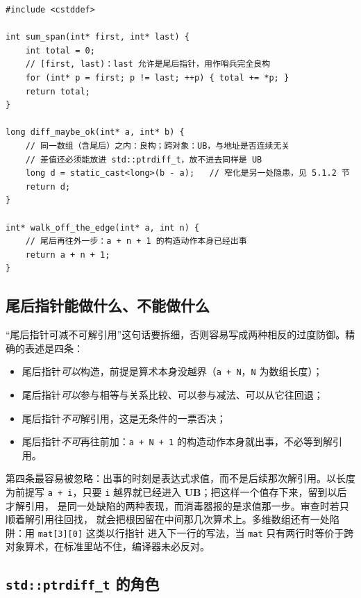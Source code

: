 \documentclass[12pt,a4paper,fontset=fandol]{ctexbook}
\newcommand{\Tp}[1]{\texttt{#1}}
\newcommand{\UB}{\textbf{\textsf{UB}}}
\begin{document}
\begin{lstlisting}[style=cppstyle, caption={合法域内与合法域外的分界}]
#include <cstddef>

int sum_span(int* first, int* last) {
    int total = 0;
    // [first, last)：last 允许是尾后指针，用作哨兵完全良构
    for (int* p = first; p != last; ++p) { total += *p; }
    return total;
}

long diff_maybe_ok(int* a, int* b) {
    // 同一数组（含尾后）之内：良构；跨对象：UB，与地址是否连续无关
    // 差值还必须能放进 std::ptrdiff_t，放不进去同样是 UB
    long d = static_cast<long>(b - a);   // 窄化是另一处隐患，见 5.1.2 节
    return d;
}

int* walk_off_the_edge(int* a, int n) {
    // 尾后再往外一步：a + n + 1 的构造动作本身已经出事
    return a + n + 1;
}
\end{lstlisting}

\subsection{尾后指针能做什么、不能做什么}\label{sec:ub05-past}

“尾后指针可减不可解引用”这句话要拆细，否则容易写成两种相反的过度防御。精确的表述是四条：

\begin{itemize}
\item 尾后指针\emph{可以}构造，前提是算术本身没越界（\Tp{a + N}，\Tp{N} 为数组长度）；
\item 尾后指针\emph{可以}参与相等与关系比较、可以参与减法、可以从它往回退；
\item 尾后指针\emph{不可}解引用，这是无条件的一票否决；
\item 尾后指针\emph{不可}再往前加：\Tp{a + N + 1} 的构造动作本身就出事，不必等到解引用。
\end{itemize}

第四条最容易被忽略：出事的时刻是表达式求值，而不是后续那次解引用。以长度为前提写
\Tp{a + i}，只要 \Tp{i} 越界就已经进入 \UB{}；把这样一个值存下来，留到以后才解引用，
是同一处缺陷的两种表现，而消毒器报的是求值那一步。审查时若只顺着解引用往回找，
就会把根因留在中间那几次算术上。多维数组还有一处陷阱：用 \Tp{mat[3][0]} 这类以行指针
进入下一行的写法，当 \Tp{mat} 只有两行时等价于跨对象算术，在标准里站不住，编译器未必反对。

\subsection{\Tp{std::ptrdiff\_t} 的角色}\label{sec:ub05-diff}
\end{document}
